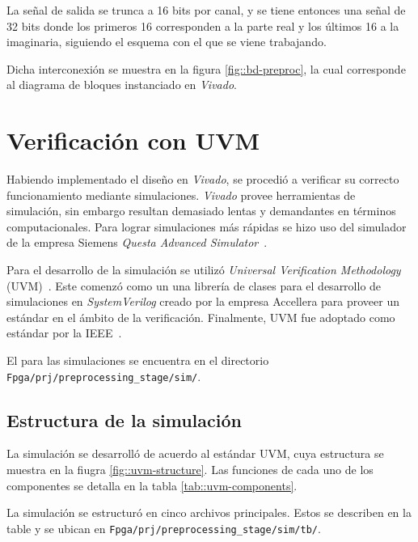 \documentclass[../../main.tex]{subfiles}
\begin{document}
La señal de salida se trunca a 16 bits por canal, y se tiene entonces una señal de 32 bits donde los primeros 16 corresponden a la parte real y los últimos 16 a la imaginaria, siguiendo el esquema con el que se viene trabajando.

Dicha interconexión se muestra en la figura \ref{fig::bd-preproc}, la cual corresponde al diagrama de bloques instanciado en \textit{Vivado}. 


\section{Verificación con UVM}\label{sec::simu-uvm}
Habiendo implementado el diseño en \textit{Vivado}, se procedió a verificar su correcto funcionamiento mediante simulaciones. \textit{Vivado} provee herramientas de simulación, sin embargo resultan demasiado lentas y demandantes en términos computacionales. Para lograr simulaciones más rápidas se hizo uso del simulador de la empresa Siemens \textit{Questa Advanced Simulator}~\cite{questa}. 

Para el desarrollo de la simulación se utilizó \textit{Universal Verification Methodology} (UVM)~\cite{uvm}. Este comenzó como un una librería de clases para el desarrollo de simulaciones en \textit{SystemVerilog} creado por la empresa Accellera para proveer un estándar en el ámbito de la verificación. Finalmente, UVM fue adoptado como estándar por la IEEE~\cite{uvm-ieee}.

El para las simulaciones se encuentra en el directorio \texttt{Fpga/prj/preprocessing\_stage/sim/}.

\subsection{Estructura de la simulación}
La simulación se desarrolló de acuerdo al estándar UVM, cuya estructura se muestra en la fiugra \ref{fig::uvm-structure}. Las funciones de cada uno de los componentes se detalla en la tabla \ref{tab::uvm-components}.


La simulación se estructuró en cinco archivos principales. Estos se describen en la table  y se ubican en \texttt{Fpga/prj/preprocessing\_stage/sim/tb/}.
\end{document}
